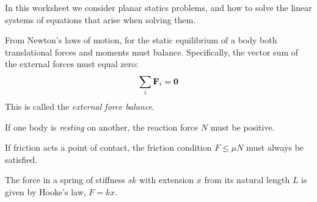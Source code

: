 In this worksheet we consider planar statics problems, and how to solve the linear systems of equations that arise when solving them.

From Newton's laws of motion, for the static equilibrium of a body both translational forces and moments must balance. Specifically, the vector sum of the external forces must equal zero:
\begin{equation} \label{eq:trans}
 \sum_{i} {\bf F}_{i}= \bf{0}
\end{equation}
This is called the {\em external force balance}. 

If one body is {\em resting} on another, the reaction force $N$ must be positive.

If friction acts a point of contact, the friction condition $F\leq \mu N$ must always be satisfied.

The force in a spring of stiffness $sk$ with extension $x$ from its natural length $L$ is given by Hooke's law, $F=kx$.